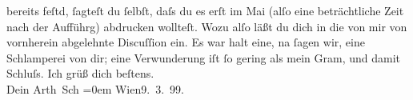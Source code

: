 \begin{ledgroupsized}[t]{13cm}
                  \label{K_L00903_2v}\label{K_L00903_2h} bereits feſtd, ſagteſt du ſelbſt, daſs du es erſt im Mai (alſo eine beträchtliche Zeit
               nach der Aufführg) abdrucken wollteſt.\pend
           \pstart
           Wozu alſo läßt du dich in die von mir von vornherein abgelehnte Discuſſion ein. Es
               war halt eine, na ſagen wir, eine Schlamperei von {\pb}dir; eine Verwunderung iſt ſo gering als mein Gram, und damit Schluſs.\pend
           \pstart
           Ich grüß dich beſtens.{\\[\baselineskip]}Dein \spacefill\mbox{Arth Sch}\pend
           \leftskip=0em{}\pstart
           Wien9. 3. 99.\pend
                     \endnumbering{}\end{ledgroupsized}  \newcommand{\dateiname}{L00903}\newcommand{\titel}{Arthur Schnitzler an Hermann Bahr, 9. 3. 1899}\newcommand{\editorInnen}{ Kurt Ifkovits,  Martin Anton Müller}
            \footnotesize
\begin{ledgroupsized}[t]{11.5cm}
\end{ledgroupsized}
         
      